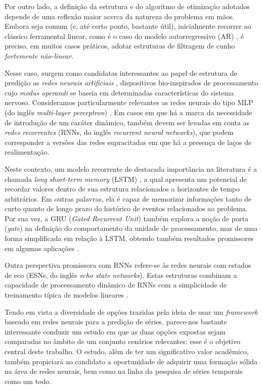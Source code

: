 \documentclass[a4paper, 12pt]{article}
\begin{document}
Por outro lado, a definição da estrutura e do algoritmo de otimização adotados depende de uma reflexão maior acerca da natureza do problema em mãos. Embora seja comum (e, até certo ponto, bastante útil), inicialmente recorrer ao clássico ferramental linear, como é o caso do modelo autorregressivo (AR) \cite{haykin2008adaptive}, é preciso, em muitos casos práticos, adotar estruturas de filtragem de cunho \textit{fortemente não-linear}.

Nesse caso, surgem como candidatas interessantes ao papel de estrutura de predição as \textit{redes neurais artificiais} \cite{haykin2008adaptive}, dispositivos bio-inspirados de processamento cujo \textit{modus operandi} se baseia em determinadas características do sistema nervoso. Consideramos particularmente relevantes as redes neurais do tipo MLP (do inglês \textit{multi-layer perceptron}) \cite{bishop2006pattern}. Em casos em que há a marca da necessidade de introdução de um caráter dinâmico, também devem ser levadas em conta as \textit{redes recorrentes} \cite{connor1994recurrent} (RNNs, do inglês \textit{recurrent neural networks}), que podem corresponder a versões das redes supracitadas em que há a presença de laços de realimentação.

Neste contexto, um modelo recorrente de destacada importância na literatura é a chamada \textit{long short-term memory} (LSTM) \cite{greff2016lstm}, a qual apresenta um potencial de recordar valores dentro de sua estrutura relacionados a horizontes de tempo arbitrários. Em outras palavras, ela é capaz de memorizar informações tanto de curto quanto de longo prazo do histórico  de eventos relacionados ao problema. Por sua vez, a GRU (\textit{Gated Recurrent Unit}) também explora a noção de porta (\textit{gate}) na definição do comportamento da unidade de processamento, mas de uma forma simplificada em relação à LSTM, obtendo também resultados promissores em algumas aplicações \cite{cho2014learning}.

Outra perspectiva promissora com RNNs refere-se às redes neurais com estados de eco (ESNs, do inglês \textit{echo state networks}). Estas estruturas combinam a capacidade de processamento dinâmico de RNNs com a simplicidade de treinamento típica de modelos lineares \cite{boccato2013novas}.

Tendo em vista a diversidade de opções trazidas pela ideia de usar um \textit{framework} baseado em redes neurais para a predição de séries, parece-nos bastante interessante conduzir um estudo em que as duas opções expostas sejam comparadas no âmbito de um conjunto cenários relevantes: esse é o objetivo central deste trabalho. O estudo, além de ter um significativo valor acadêmico, também propiciará ao candidato a oportunidade de adquirir uma formação sólida na área de redes neurais, bem como na linha da pesquisa de séries temporais como um todo.
\end{document}
